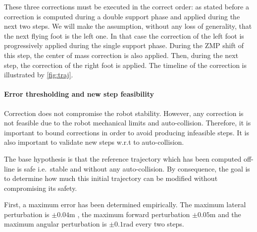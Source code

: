 These three corrections must be executed in the correct order: as
stated before a correction is computed during a double support phase
and applied during the next two steps. We will make the assumption,
without any loss of generality, that the next flying foot is the left
one. In that case the correction of the left foot is progressively
applied during the single support phase. During the ZMP shift of this
step, the center of mass correction is also applied. Then, during the
next step, the correction of the right foot is applied. The timeline
of the correction is illustrated by \ref{fig:traj}.


\vspace{0.3cm}
\paragraph{Error thresholding and new step feasibility}


Correction does not compromise the robot stability. However, any
correction is not feasible due to the robot mechanical limits and
auto-collision. Therefore, it is important to bound corrections in
order to avoid producing infeasible steps. It is also important to
validate new steps w.r.t to auto-collision.


The base hypothesis is that the reference trajectory which has been
computed off-line is safe i.e.\ stable and without any
auto-collision. By consequence, the goal is to determine how much this
initial trajectory can be modified without compromising its safety.

First, a maximum error has been determined empirically. The maximum
lateral perturbation is $\pm 0.04 \mathrm{m}$ , the maximum forward
perturbation $\pm 0.05 \mathrm{m}$ and the maximum angular
perturbation is $\pm 0.1 \mathrm{rad}$ every two steps.

